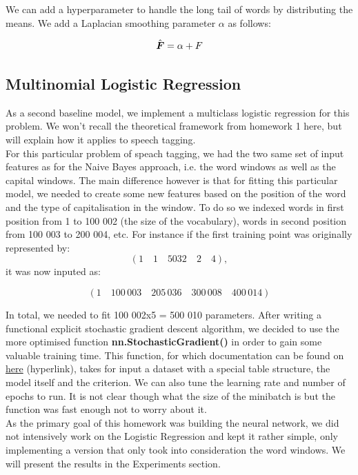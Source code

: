 \documentclass[11pt]{article}
\begin{document}
\noindent We can add a hyperparameter to handle the long tail of words by distributing the means. We add a Laplacian smoothing parameter $\alpha$ as follows:

  \[\hat{\boldsymbol{F}} = \alpha + F\]

\subsection{Multinomial Logistic Regression}

As a second baseline model, we implement a multiclass logistic regression for this problem. We won't recall the theoretical framework from homework 1 here, but will explain how it applies to speech tagging.\\

\noindent For this particular problem of speach tagging, we had the two same set of input features as for the Naive Bayes approach, i.e. the word windows as well as the capital windows. The main difference however is that for fitting this particular model, we needed to create some new features based on the position of the word and the type of capitalisation in the window. To do so we indexed words in first position from 1 to 100 002 (the size of the vocabulary), words in second position from 100 003 to 200 004, etc. For instance if the first training point was originally represented by: 
$$ \left(1 \quad 1 \quad 5032 \quad 2 \quad 4\right),$$ \noindent it was now inputed as:

$$ \left(1 \quad 100\, 003 \quad 205\, 036 \quad 300\, 008 \quad 400\, 014\right)$$

\noindent In total, we needed to fit 100 002x5 = 500 010 parameters. After writing a functional explicit stochastic gradient descent algorithm, we decided to use the more optimised function \newline \textbf{nn.StochasticGradient()} in order to gain some valuable training time. This function, for which documentation can be found on \href{https://github.com/torch/nn/blob/master/doc/training.md}{here} (hyperlink), takes for input a dataset with a special table structure, the model itself and the criterion. We can also tune the learning rate and number of epochs to run. It is not clear though what the size of the minibatch is but the function was fast enough not to worry about it.\\

\noindent As the primary goal of this homework was building the neural network, we did not intensively work on the Logistic Regression and kept it rather simple, only implementing a version that only took into consideration the word windows. We will present the results in the Experiments section.
 
\end{document}

